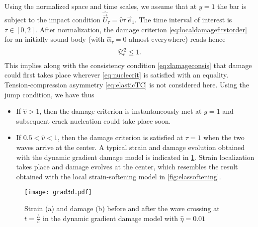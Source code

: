 Using the normalized space and time scales, we assume that at $y=1$ the bar is subject to the impact condition $\widehat{\vec{U}}_\tau=\widehat{v}\tau\,\vec{e}_1$. The time interval of interest is $\tau\in[0,2]$. After normalization, the damage criterion \eqref{eq:localdamagefirstorder} for an initially sound body (with $\widehat{\alpha}_\tau=0$ almost everywhere) reads hence
\begin{equation} \label{eq:nuclecrit}
\widehat{u}_\tau'^2\leq 1.
\end{equation}
This implies along with the consistency condition \eqref{eq:damageconsis} that damage could first takes place wherever \eqref{eq:nuclecrit} is satisfied with an equality. Tension-compression asymmetry \eqref{eq:elasticTC} is not considered here. Using the jump condition, we have thus
\begin{itemize}
\item If $\widehat{v}>1$, then the damage criterion is instantaneously met at $y=1$ and subsequent crack nucleation could take place soon.
\item If $0.5<\widehat{v}<1$, then the damage criterion is satisfied at $\tau=1$ when the two waves arrive at the center. A typical strain and damage evolution obtained with the dynamic gradient damage model is indicated in \cref{fig:grad3d}. Strain localization takes place and damage evolves at the center, which resembles the result obtained with the local strain-softening model in \cref{fig:elassoftening}.
\end{itemize}
\begin{figure}[htbp]
\centering
\texttt{[image: grad3d.pdf]}
\caption{Strain (a) and damage (b) before and after the wave crossing at $t=\frac{L}{c}$ in the dynamic gradient damage model with $\widehat{\eta}=0.01$} \label{fig:grad3d}
\end{figure}

